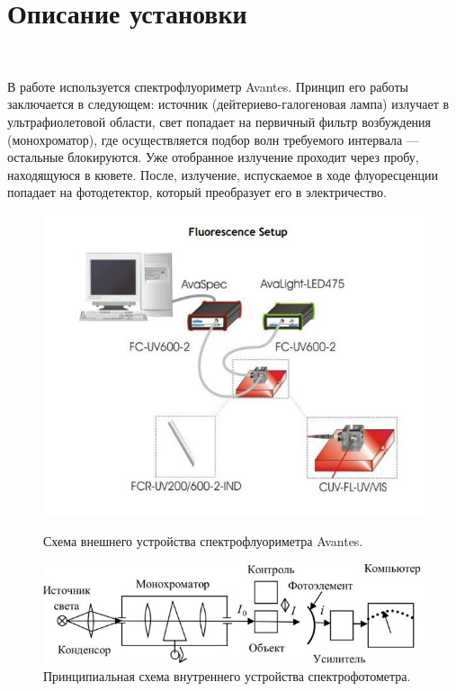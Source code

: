 \documentclass{article}
\begin{document}
\section{Описание установки}\
\par В работе используется спектрофлуориметр Avantes.
Принцип его работы заключается в следующем: источник (дейтериево-галогеновая лампа) излучает в ультрафиолетовой области, свет попадает на первичный фильтр возбуждения (монохроматор), где осуществляется подбор волн требуемого интервала — остальные блокируются. Уже отобранное излучение проходит через пробу, находящуюся в кювете. После, излучение, испускаемое в ходе флуоресценции попадает на фотодетектор, который преобразует его в электричество.
\begin{figure}[!htb] 
            \includegraphics[width=\linewidth]{Images/схема устройства.png}
            \caption{Схема внешнего устройства спектрофлуориметра Avantes.}
        \endminipage\hfill
             \includegraphics[width=\linewidth]{Images/спектрофотометр.png}
              \caption{Принципиальная схема внутреннего устройства спектрофотометра.}
        \endminipage
    \end{figure}
\end{document}
